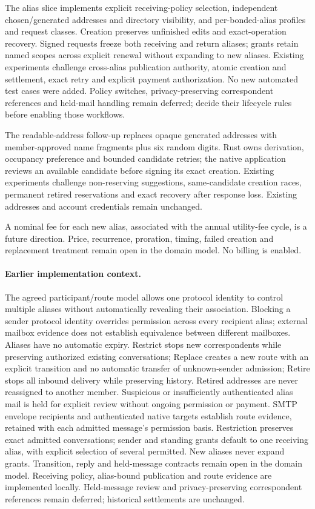 \documentclass[11pt]{article}
\begin{document}
The alias slice implements explicit receiving-policy selection, independent
chosen/generated addresses and directory visibility, and per-bonded-alias profiles
and request classes. Creation preserves unfinished edits and exact-operation
recovery. Signed requests freeze both receiving and return aliases; grants retain
named scopes across explicit renewal without expanding to new aliases. Existing
experiments challenge cross-alias publication authority, atomic creation and
settlement, exact retry and explicit payment authorization. No new automated test
cases were added. Policy switches, privacy-preserving correspondent references and
held-mail handling remain deferred; decide their lifecycle rules before enabling
those workflows.

The readable-address follow-up replaces opaque generated addresses with
member-approved name fragments plus six random digits. Rust owns derivation,
occupancy preference and bounded candidate retries; the native application reviews
an available candidate before signing its exact creation. Existing experiments
challenge non-reserving suggestions, same-candidate creation races, permanent
retired reservations and exact recovery after response loss. Existing addresses
and account credentials remain unchanged.

A nominal fee for each new alias, associated with the annual utility-fee cycle,
is a future direction. Price, recurrence, proration, timing, failed creation and
replacement treatment remain open in the domain model. No billing is enabled.

\paragraph{Earlier implementation context.}


The agreed participant/route model allows one protocol identity to control
multiple aliases without automatically revealing their association. Blocking a
sender protocol identity overrides permission across every recipient alias;
external mailbox evidence does not establish equivalence between different
mailboxes. Aliases have no automatic expiry. Restrict stops new
correspondents while preserving authorized existing conversations; Replace creates
a new route with an explicit transition and no automatic transfer of unknown-sender
admission; Retire stops all inbound delivery while preserving history. Retired
addresses are never reassigned to another member. Suspicious or insufficiently
authenticated alias mail is held for explicit review without ongoing
permission or payment. SMTP envelope recipients and authenticated native targets
establish route evidence, retained with each admitted message's permission basis.
Restriction preserves exact admitted conversations; sender and standing grants
default to one receiving alias, with explicit selection of several permitted.
New aliases never expand grants. Transition, reply and held-message contracts
remain open in the domain model. Receiving policy, alias-bound publication and route evidence are implemented locally.
Held-message review and privacy-preserving correspondent references remain deferred;
historical settlements are unchanged.
\end{document}

